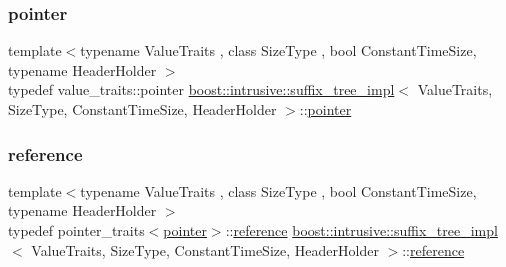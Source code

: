 \mbox{\label{classboost_1_1intrusive_1_1suffix__tree__impl_af8ad26e95f6cc7ba4a814d02eb8f4320}} 
\subsubsection{\texorpdfstring{pointer}{pointer}}
{\footnotesize\ttfamily template$<$typename Value\+Traits , class Size\+Type , bool Constant\+Time\+Size, typename Header\+Holder $>$ \\
typedef value\+\_\+traits\+::pointer \hyperlink{classboost_1_1intrusive_1_1suffix__tree__impl}{boost\+::intrusive\+::suffix\+\_\+tree\+\_\+impl}$<$ Value\+Traits, Size\+Type, Constant\+Time\+Size, Header\+Holder $>$\+::\hyperlink{classboost_1_1intrusive_1_1suffix__tree__impl_af8ad26e95f6cc7ba4a814d02eb8f4320}{pointer}}

\mbox{\label{classboost_1_1intrusive_1_1suffix__tree__impl_af66898eb8c69a952f6a92f6c6b704bed}} 
\subsubsection{\texorpdfstring{reference}{reference}}
{\footnotesize\ttfamily template$<$typename Value\+Traits , class Size\+Type , bool Constant\+Time\+Size, typename Header\+Holder $>$ \\
typedef pointer\+\_\+traits$<$\hyperlink{classboost_1_1intrusive_1_1suffix__tree__impl_af8ad26e95f6cc7ba4a814d02eb8f4320}{pointer}$>$\+::\hyperlink{classboost_1_1intrusive_1_1suffix__tree__impl_af66898eb8c69a952f6a92f6c6b704bed}{reference} \hyperlink{classboost_1_1intrusive_1_1suffix__tree__impl}{boost\+::intrusive\+::suffix\+\_\+tree\+\_\+impl}$<$ Value\+Traits, Size\+Type, Constant\+Time\+Size, Header\+Holder $>$\+::\hyperlink{classboost_1_1intrusive_1_1suffix__tree__impl_af66898eb8c69a952f6a92f6c6b704bed}{reference}}

\mbox{\label{classboost_1_1intrusive_1_1suffix__tree__impl_ad98ea23cb22b9adc18366b5d8ab56d9b}} 
